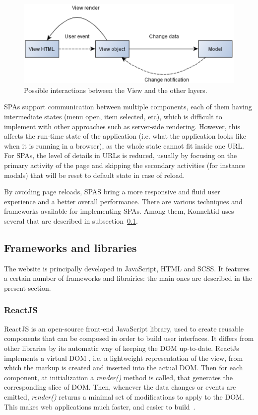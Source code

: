\begin{figure}[H]
    \centering
    \includegraphics[scale=0.6]{figure/view.png}
    \caption{Possible interactions between the View and the other layers.}
    \label{fig:view}
\end{figure}

SPAs support communication between multiple components, each of them having intermediate states (menu open, item selected, etc), which is difficult to
implement with other approaches such as server-side rendering. However, this affects the run-time state of the application (i.e. what the application looks like when it is
running in a browser), as the whole state cannot fit inside one URL. For SPAs, the level of details in URLs is reduced, usually by focusing on the primary activity
of the page and skipping the secondary activities (for instance modals) that will be reset to default state in case of reload.

By avoiding page reloads, SPAS bring a more responsive and fluid user experience and a better overall performance.
There are various techniques and frameworks available for implementing SPAs.
Among them, Konnektid uses several that are described in {\sc subsection}~\ref{ssec:frameworks}.

\subsection{Frameworks and libraries}
\label{ssec:frameworks}

The website is principally developed in JavaScript, HTML and SCSS. It features a certain number of frameworks and librairies: the main ones are described in the present section.

\subsubsection{ReactJS}
\label{sssec:react}

ReactJS is an open-source front-end JavaScript library, used to create reusable components that can be composed in order to build user interfaces. It differs from other libraries by its automatic way of keeping the DOM up-to-date. ReactJs implements a \guillemotleft{} virtual DOM \guillemotright{}, i.e. a lightweight representation of the view, from which the markup is created and inserted into the actual DOM. Then for each component, at initialization a \textit{render()} method is called, that generates the corresponding slice of DOM. Then, whenever the data changes or events are emitted, \textit{render()} returns a minimal set of modifications to apply to the DOM.
This makes web applications much faster, and easier to build~\cite{whyReact}.

